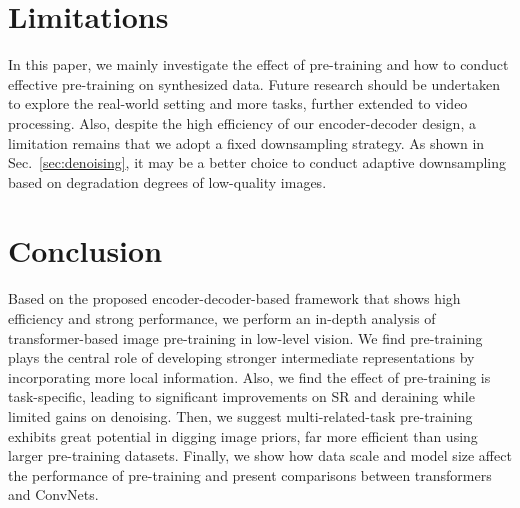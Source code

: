 \documentclass[runningheads]{llncs}
\begin{document}
	\section{Limitations}
	In this paper, we mainly investigate the effect of pre-training and how to conduct effective pre-training on synthesized data. Future research should be undertaken to explore the real-world setting and more tasks, further extended to video processing. Also, despite the high efficiency of our encoder-decoder design, a limitation remains that we adopt a fixed downsampling strategy. As shown in Sec.~\ref{sec:denoising}, it may be a better choice to conduct adaptive downsampling based on degradation degrees of low-quality images.
	


	\section{Conclusion}
	Based on the proposed encoder-decoder-based framework that shows high efficiency and strong performance, we perform an in-depth analysis of transformer-based image pre-training in low-level vision. We find pre-training plays the central role of developing stronger intermediate representations by incorporating more local information. Also, we find the effect of pre-training is task-specific, leading to significant improvements on SR and deraining while limited gains on denoising. Then, we suggest multi-related-task pre-training exhibits great potential in digging image priors, far more efficient than using larger pre-training datasets. Finally, we show how data scale and model size affect the performance of pre-training and present comparisons between transformers and ConvNets.
	




	\clearpage

	
	
	\clearpage
	
	\renewcommand\thesection{\Alph{section}}
	\renewcommand\thesubsection{\thesection.\arabic{subsection}}
	\renewcommand\thefigure{\Alph{section}.\arabic{figure}}
	\renewcommand\thetable{\Alph{section}.\arabic{table}} 
	
	\setcounter{section}{0}
	\setcounter{figure}{0}
	\setcounter{table}{0}
	
	\begin{center}
	\end{center}
	\vspace{0.2in}
	
\end{document}
